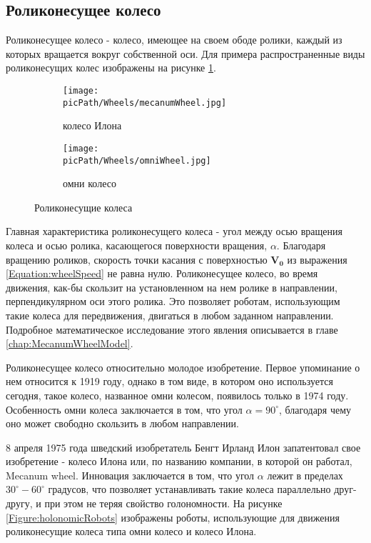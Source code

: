 \documentclass[oneside,final,14pt]{extreport}
\newcommand{\picPath}{img}
\newcommand{\bs}{\boldsymbol}
\begin{document}
\subsection{Роликонесущее колесо}
Роликонесущее колесо - колесо, имеющее на своем ободе ролики, каждый из которых вращается вокруг собственной оси. Для примера распространенные виды роликонесущих колес изображены на рисунке \ref{Figure:rollerHandedWheels}.
\begin{figure}[H]
  \centering
  \begin{subfigure}[b]{0.4\linewidth}
   \texttt{[image: \\picPath/Wheels/mecanumWheel.jpg]}
    \caption{ колесо Илона }
  \end{subfigure}
  \begin{subfigure}[b]{0.4\linewidth}
    \texttt{[image: \\picPath/Wheels/omniWheel.jpg]}
    \caption{ омни колесо }
  \end{subfigure}
  \caption{ Роликонесущие колеса}
  \label{Figure:rollerHandedWheels}
\end{figure}

Главная характеристика роликонесущего колеса - угол между осью вращения колеса и  осью ролика, касающегося поверхности вращения, $\alpha$. Благодаря вращению роликов, скорость точки касания с поверхностью $\bs{V_{0}}$ из выражения \ref{Equation:wheelSpeed} не равна нулю. Роликонесущее колесо, во время движения, как-бы скользит на установленном на нем ролике в направлении, перпендикулярном оси этого ролика. Это позволяет роботам, использующим такие колеса для передвижения, двигаться в любом заданном направлении. Подробное математическое исследование этого явления описывается в главе \ref{chap:MecanumWheelModel}.

Роликонесущее колесо относительно молодое изобретение. Первое упоминание о нем относится к 1919 году\cite{OmniWheelPatent}, однако в том виде, в котором оно используется сегодня, такое колесо, названное омни колесом, появилось только в	1974 году\cite{OmniWheelPatentModern}. Особенность омни колеса заключается в том, что угол $\alpha = 90^{\circ}$, благодаря чему оно может свободно скользить в любом направлении.

8 апреля 1975 года шведский изобретатель Бенгт Ирланд Илон запатентовал свое изобретение - колесо Илона или, по названию компании, в которой он работал, Mecanum wheel\cite{MecanumWheelPatent}. Инновация заключается в том, что   угол $\alpha$  лежит в пределах $30^{\circ}-60^{\circ}$  градусов, что позволяет устанавливать такие колеса параллельно друг-другу, и при этом не теряя свойство голономности. На рисунке \ref{Figure:holonomicRobots} изображены роботы, использующие для движения роликонесущие колеса типа омни колесо и колесо Илона.
\end{document}

